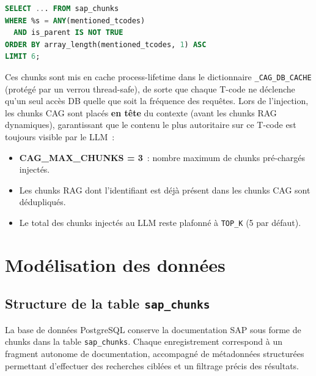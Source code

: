 \begin{lstlisting}[language=SQL, caption={Requête CAG : chunks les plus ciblés pour un T-code}]
SELECT ... FROM sap_chunks
WHERE %s = ANY(mentioned_tcodes)
  AND is_parent IS NOT TRUE
ORDER BY array_length(mentioned_tcodes, 1) ASC
LIMIT 6;
\end{lstlisting}

Ces chunks sont mis en cache process-lifetime dans le dictionnaire \texttt{\_CAG\_DB\_CACHE} (protégé par un verrou thread-safe), de sorte que chaque T-code ne déclenche qu'un seul accès DB quelle que soit la fréquence des requêtes. Lors de l'injection, les chunks CAG sont placés \textbf{en tête} du contexte (avant les chunks RAG dynamiques), garantissant que le contenu le plus autoritaire sur ce T-code est toujours visible par le LLM~:

\begin{itemize}[leftmargin=2em]
  \item \textbf{CAG\_MAX\_CHUNKS = 3}~: nombre maximum de chunks pré-chargés injectés.
  \item Les chunks RAG dont l'identifiant est déjà présent dans les chunks CAG sont dédupliqués.
  \item Le total des chunks injectés au LLM reste plafonné à \texttt{TOP\_K} (5 par défaut).
\end{itemize}

\section{Modélisation des données}

\subsection{Structure de la table \texttt{sap\_chunks}}

La base de données PostgreSQL conserve la documentation SAP sous forme de chunks dans la table \texttt{sap\_chunks}. Chaque enregistrement correspond à un fragment autonome de documentation, accompagné de métadonnées structurées permettant d’effectuer des recherches ciblées et un filtrage précis des résultats.

